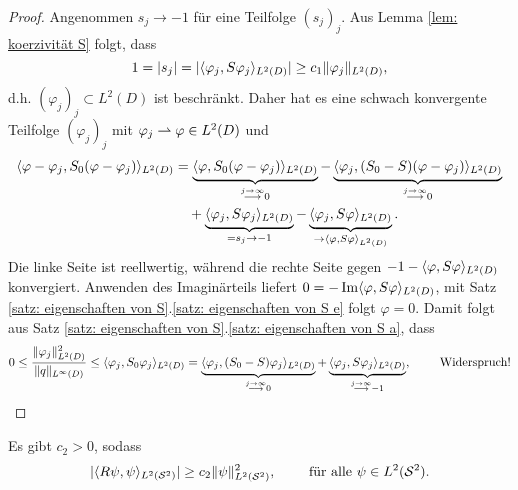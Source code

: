 \begin{proof}
	Angenommen \(s_j\to-1\) für eine Teilfolge \((s_j)_j\). Aus Lemma \ref{lem: koerzivität S} folgt, dass
	\begin{equation*}
		1=|s_j|=|\langle \varphi_j,S\varphi_j\rangle_{L^2(D)}|\geq c_1\|\varphi_j\|_{L^2(D)},
	\end{equation*}
	d.h. \((\varphi_j)_j\subset L^2(D)\) ist beschränkt. Daher hat es eine schwach konvergente Teilfolge \((\varphi_j)_j\) mit \(\varphi_j\rightharpoonup\varphi\in L^2(D)\) und
	\begin{align*}
		\langle \varphi-\varphi_j,S_0(\varphi-\varphi_j)\rangle_{L^2(D)}
		&=\underbrace{\langle \varphi,S_0(\varphi-\varphi_j)\rangle_{L^2(D)}}_{\overset{j\to\infty}{\longrightarrow}0}
		-\underbrace{\langle \varphi_j,(S_0-S)(\varphi-\varphi_j)\rangle_{L^2(D)}}_{\overset{j\to\infty}{\longrightarrow}0}\\
		&\quad+\underbrace{\langle \varphi_j,S\varphi_j\rangle_{L^2(D)}}_{=s_j\to-1}
		-\underbrace{\langle \varphi_j,S\varphi\rangle_{L^2(D)}}_{\to\langle \varphi,S\varphi\rangle_{L^2(D)}}.
	\end{align*}
	Die linke Seite ist reellwertig, während die rechte Seite gegen \(-1-\langle \varphi,S\varphi\rangle_{L^2(D)}\) konvergiert. Anwenden des Imaginärteils liefert \(0=-\operatorname{Im}\langle \varphi,S\varphi\rangle_{L^2(D)}\), mit Satz \ref{satz: eigenschaften von S}.\ref{satz: eigenschaften von S e} folgt \(\varphi=0\). Damit folgt aus Satz \ref{satz: eigenschaften von S}.\ref{satz: eigenschaften von S a}, dass
	\begin{equation*}
		0
		\leq\frac{\|\varphi_j\|_{L^2(D)}^2}{\|q\|_{L^{\infty}(D)}}
		\leq\langle \varphi_j,S_0\varphi_j\rangle_{L^2(D)}
		=\underbrace{\langle \varphi_j,(S_0-S)\varphi_j\rangle_{L^2(D)}}_{\overset{j\to\infty}{\longrightarrow}0}
		+\underbrace{\langle \varphi_j,S\varphi_j\rangle_{L^2(D)}}_{\overset{j\to\infty}{\longrightarrow}-1},\qquad\text{ Widerspruch!}
	\end{equation*}
\end{proof}
\begin{lem}\label{lem: koerzivität operator R bzgl. L2(S2) norm}
	Es gibt \(c_2>0\), sodass
	\begin{equation}
		\label{koerzivität operator R bzgl. L2(S2) norm}
		|\langle R\psi, \psi\rangle_{L^2(\mathcal{S}^2)}|\geq c_2\|\psi\|_{L^2(\mathcal{S}^2)}^2,\qquad\text{ für alle }\psi\in L^2(\mathcal{S}^2).
	\end{equation}
\end{lem}
